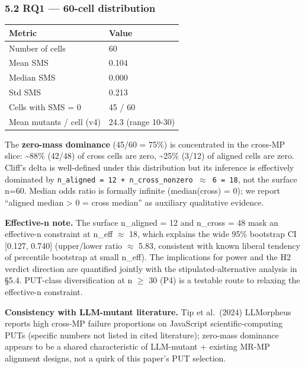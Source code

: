 \documentclass[review,12pt,authoryear]{elsarticle}
\newcounter{none}                   %
\begin{document}
\subsubsection{5.2 RQ1 --- 60-cell
distribution}\label{rq1-60-cell-distribution}

{\def\LTcaptype{none} %
\begin{longtable}[]{@{}ll@{}}
\toprule\noalign{}
Metric & Value \\
\midrule\noalign{}
\endhead
\bottomrule\noalign{}
\endlastfoot
Number of cells & 60 \\
Mean SMS & 0.104 \\
Median SMS & 0.000 \\
Std SMS & 0.213 \\
Cells with SMS = 0 & 45 / 60 \\
Mean mutants / cell (v4) & 24.3 (range 10-30) \\
\end{longtable}
}

The \textbf{zero-mass dominance} (45/60 = 75\%) is concentrated in the
cross-MP slice: \textasciitilde88\% (42/48) of cross cells are zero,
\textasciitilde25\% (3/12) of aligned cells are zero. Cliff's delta is
well-defined under this distribution but its inference is effectively
dominated by
\texttt{n\_aligned\ =\ 12\ +\ n\_cross\_nonzero\ $\approx$\ 6\ =\ 18}, not the
surface n=60. Median odds ratio is formally infinite (median(cross) =
0); we report ``aligned median \textgreater{} 0 = cross median'' as
auxiliary qualitative evidence.

\textbf{Effective-n note.} The surface n\_aligned = 12 and n\_cross = 48
mask an effective-n constraint at n\_eff $\approx$ 18, which explains the wide
95\% bootstrap CI {[}0.127, 0.740{]} (upper/lower ratio $\approx$ 5.83,
consistent with known liberal tendency of percentile bootstrap at small
n\_eff). The implications for power and the H2 verdict direction are
quantified jointly with the stipulated-alternative analysis in §5.4.
PUT-class diversification at n $\geq$ 30 (P4) is a testable route to relaxing
the effective-n constraint.

\textbf{Consistency with LLM-mutant literature.} Tip et al.~(2024)
LLMorpheus reports high cross-MP failure proportions on JavaScript
scientific-computing PUTs (specific numbers not listed in cited
literature); zero-mass dominance appears to be a shared characteristic
of LLM-mutant + existing MR-MP alignment designs, not a quirk of this
paper's PUT selection.
\end{document}
